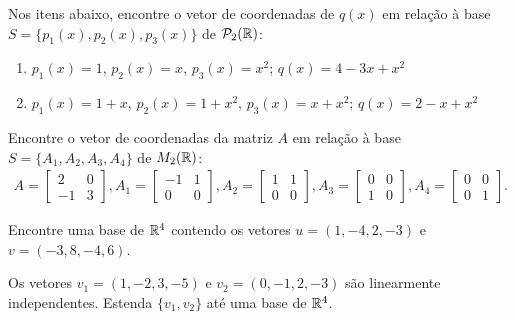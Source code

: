 \documentclass[12pt]{exam}
\begin{document}
    \begin{exercicio}
        Nos itens abaixo, encontre o vetor de coordenadas de $q(x)$ em relação à base $S = \{p_1(x), p_2(x), p_3(x)\}$ de $\mathcal{P}_2(\mathbb{R})$:
        \begin{enumerate}
            \item $p_1(x) = 1$, $p_2(x) = x$, $p_3(x) = x^2$; $q(x) = 4 - 3x + x^2$
            \item $p_1(x) = 1 + x$, $p_2(x) = 1 + x^2$, $p_3(x) = x + x^2$; $q(x) = 2 - x + x^2$
        \end{enumerate}
    \end{exercicio}

    \begin{exercicio}
        Encontre o vetor de coordenadas da matriz $A$ em relação à base $S = \{A_1, A_2, A_3, A_4\}$ de $M_2(\mathbb{R})$:
        \begin{align*}
            A = \begin{bmatrix}
                2 & 0\\
                -1 & 3
            \end{bmatrix},
            A_1 = \begin{bmatrix}
                -1 & 1\\
                0 & 0
            \end{bmatrix},
            A_2 = \begin{bmatrix}
                1 & 1\\
                0 & 0
            \end{bmatrix},
            A_3 = \begin{bmatrix}
                0 & 0\\
                1 & 0
            \end{bmatrix},
            A_4 = \begin{bmatrix}
                0 & 0\\
                0 & 1
            \end{bmatrix}.
        \end{align*}
    \end{exercicio}

    \begin{exercicio}
        Encontre uma base de $\mathbb{R}^4$ contendo os vetores $u = (1, -4, 2, -3)$ e $v = (-3, 8, -4, 6)$.
    \end{exercicio}

    \begin{exercicio}
        Os vetores $v_1 = (1, -2, 3, -5)$ e $v_2 = (0, -1, 2, -3)$ são linearmente independentes. Estenda $\{v_1, v_2\}$ até uma base de $\mathbb{R}^4$.
    \end{exercicio}
\end{document}
